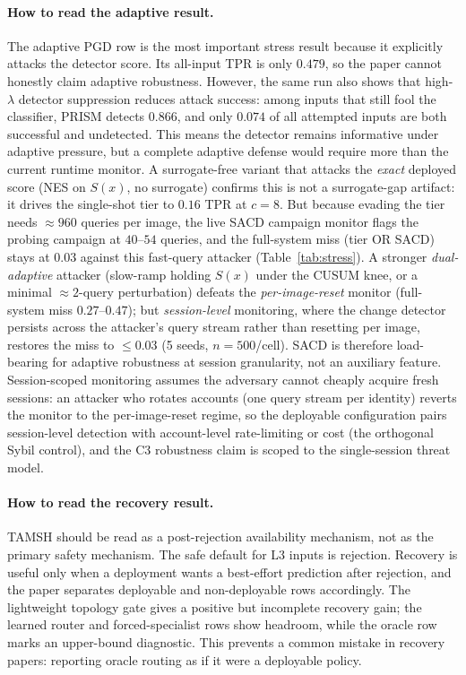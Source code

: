 \documentclass{article}
\newcommand{\prism}{\textsc{PRISM}\xspace}
\newcommand{\sacd}{\textsc{SACD}\xspace}
\newcommand{\tamsh}{\textsc{TAMSH}\xspace}
\begin{document}
\paragraph{How to read the adaptive result.}
The adaptive PGD row is the most important stress result because it explicitly attacks the detector score. Its all-input TPR is only $0.479$, so the paper cannot honestly claim adaptive robustness. However, the same run also shows that high-$\lambda$ detector suppression reduces attack success: among inputs that still fool the classifier, \prism detects $0.866$, and only $0.074$ of all attempted inputs are both successful and undetected. This means the detector remains informative under adaptive pressure, but a complete adaptive defense would require more than the current runtime monitor. A surrogate-free variant that attacks the \emph{exact} deployed score (NES on $S(x)$, no surrogate) confirms this is not a surrogate-gap artifact: it drives the single-shot tier to $0.16$ TPR at $c=8$. But because evading the tier needs ${\approx}960$ queries per image, the live \sacd campaign monitor flags the probing campaign at $40$--$54$ queries, and the full-system miss (tier OR \sacd) stays at $0.03$ against this fast-query attacker (Table~\ref{tab:stress}). A stronger \emph{dual-adaptive} attacker (slow-ramp holding $S(x)$ under the CUSUM knee, or a minimal ${\approx}2$-query perturbation) defeats the \emph{per-image-reset} monitor (full-system miss $0.27$--$0.47$); but \emph{session-level} monitoring, where the change detector persists across the attacker's query stream rather than resetting per image, restores the miss to ${\le}0.03$ (5 seeds, $n{=}500$/cell). \sacd is therefore load-bearing for adaptive robustness at session granularity, not an auxiliary feature. Session-scoped monitoring assumes the adversary cannot cheaply acquire fresh sessions: an attacker who rotates accounts (one query stream per identity) reverts the monitor to the per-image-reset regime, so the deployable configuration pairs session-level detection with account-level rate-limiting or cost (the orthogonal Sybil control), and the C3 robustness claim is scoped to the single-session threat model.

\paragraph{How to read the recovery result.}
\tamsh should be read as a post-rejection availability mechanism, not as the primary safety mechanism. The safe default for L3 inputs is rejection. Recovery is useful only when a deployment wants a best-effort prediction after rejection, and the paper separates deployable and non-deployable rows accordingly. The lightweight topology gate gives a positive but incomplete recovery gain; the learned router and forced-specialist rows show headroom, while the oracle row marks an upper-bound diagnostic. This prevents a common mistake in recovery papers: reporting oracle routing as if it were a deployable policy.
\end{document}
